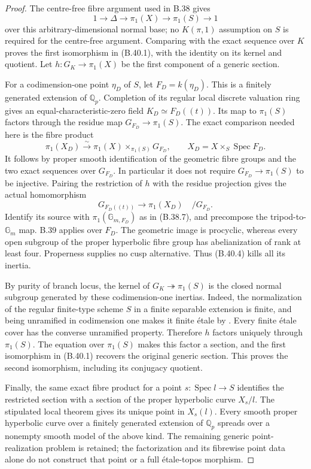 \documentclass[11pt,oneside]{article}
\begin{document}
\begin{proof}
The centre-free fibre argument used in B.38 gives
\[
 1\longrightarrow\Delta\longrightarrow\pi_1(X)
       \longrightarrow\pi_1(S)\longrightarrow1
 \tag{B.40.2}
\]
over this arbitrary-dimensional normal base; no
$K(\pi,1)$ assumption on $S$ is required for the
centre-free argument. Comparing with the exact
sequence over $K$ proves the first isomorphism in
(B.40.1), with the identity on its kernel and quotient.
Let $h:G_K\to\pi_1(X)$ be the first component of
a generic section.

For a codimension-one point $\eta_D$ of $S$, let
$F_D=k(\eta_D)$. This is a finitely generated
extension of $\mathbb Q_p$. Completion of its
regular local discrete valuation ring gives an
equal-characteristic-zero field
$K_D\simeq F_D((t))$. Its map to $\pi_1(S)$
factors through the residue map $G_{F_D}\to\pi_1(S)$.
The exact comparison needed here is the fibre
product
\[
 \pi_1(X_D)\xrightarrow{\sim}
       \pi_1(X)\times_{\pi_1(S)}G_{F_D},
 \qquad X_D=X\times_S\operatorname{Spec}F_D.
 \tag{B.40.3}
\]
It follows by proper smooth identification of the
geometric fibre groups and the two exact sequences
over $G_{F_D}$. In particular it does not require
$G_{F_D}\to\pi_1(S)$ to be injective.
Pairing the restriction of $h$ with the residue
projection gives the actual homomorphism
\[
 G_{F_D((t))}\longrightarrow\pi_1(X_D)
                                      \quad/G_{F_D}.
 \tag{B.40.4}
\]
Identify its source with $\pi_1(\mathbb G_{m,F_D})$
as in (B.38.7), and precompose the tripod-to-$\mathbb G_m$
map. B.39 applies over $F_D$. The geometric image
is procyclic, whereas every open subgroup of the
proper hyperbolic fibre group has abelianization
of rank at least four. Properness supplies no cusp
alternative. Thus (B.40.4) kills all its inertia.

By purity of branch locus, the kernel of
$G_K\twoheadrightarrow\pi_1(S)$ is the closed
normal subgroup generated by these codimension-one
inertias. Indeed, the normalization of the regular
finite-type scheme $S$ in a finite separable
extension is finite, and being unramified in
codimension one makes it finite \'etale by
\cite[Lemma 58.21.4 and Example 58.13.3]{B_StacksPurity}.
Every finite \'etale cover has the converse
unramified property. Therefore $h$ factors uniquely
through $\pi_1(S)$. The equation over $\pi_1(S)$
makes this factor a section, and the first
isomorphism in (B.40.1) recovers the original
generic section. This proves the second isomorphism,
including its conjugacy quotient.

Finally, the same exact fibre product for a point
$s:\operatorname{Spec}l\to S$ identifies the
restricted section with a section of the proper
hyperbolic curve $X_s/l$. The stipulated local
theorem gives its unique point in $X_s(l)$.
Every smooth proper hyperbolic curve over a
finitely generated extension of $\mathbb Q_p$
spreads over a nonempty smooth model of the above
kind. The remaining generic point-realization
problem is retained; the factorization and its
fibrewise point data alone do not construct that
point or a full \'etale-topos morphism.
\end{proof}
\end{document}
